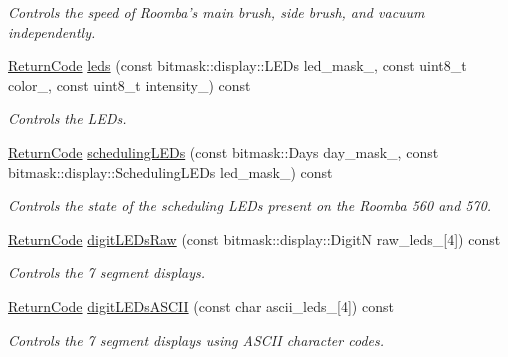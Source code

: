 \begin{DoxyCompactItemize}
\begin{DoxyCompactList}\small\item\em Controls the speed of Roomba’s main brush, side brush, and vacuum independently. \end{DoxyCompactList}\item 
\hyperlink{classroomba_1_1series500_1_1oi_1_1_o_i_encoder_ac2c8ad2f0306050926f89882d74696cc}{Return\+Code} \hyperlink{classroomba_1_1series500_1_1oi_1_1_o_i_encoder_a4f382fc939dad7b6a9618e36a5cf4d47}{leds} (const bitmask\+::display\+::\+L\+E\+Ds led\+\_\+mask\+\_\+, const uint8\+\_\+t color\+\_\+, const uint8\+\_\+t intensity\+\_\+) const 
\begin{DoxyCompactList}\small\item\em Controls the L\+E\+Ds. \end{DoxyCompactList}\item 
\hyperlink{classroomba_1_1series500_1_1oi_1_1_o_i_encoder_ac2c8ad2f0306050926f89882d74696cc}{Return\+Code} \hyperlink{classroomba_1_1series500_1_1oi_1_1_o_i_encoder_a42fe70c13a369206c439002c5859a27d}{scheduling\+L\+E\+Ds} (const bitmask\+::\+Days day\+\_\+mask\+\_\+, const bitmask\+::display\+::\+Scheduling\+L\+E\+Ds led\+\_\+mask\+\_\+) const 
\begin{DoxyCompactList}\small\item\em Controls the state of the scheduling L\+E\+Ds present on the Roomba 560 and 570. \end{DoxyCompactList}\item 
\hyperlink{classroomba_1_1series500_1_1oi_1_1_o_i_encoder_ac2c8ad2f0306050926f89882d74696cc}{Return\+Code} \hyperlink{classroomba_1_1series500_1_1oi_1_1_o_i_encoder_aafaa740b0a3d1214e351623fa736ed82}{digit\+L\+E\+Ds\+Raw} (const bitmask\+::display\+::\+Digit\+N raw\+\_\+leds\+\_\+\mbox{[}4\mbox{]}) const 
\begin{DoxyCompactList}\small\item\em Controls the 7 segment displays. \end{DoxyCompactList}\item 
\hyperlink{classroomba_1_1series500_1_1oi_1_1_o_i_encoder_ac2c8ad2f0306050926f89882d74696cc}{Return\+Code} \hyperlink{classroomba_1_1series500_1_1oi_1_1_o_i_encoder_ae660ba123459c7fcdef6b8db247e56cf}{digit\+L\+E\+Ds\+A\+S\+C\+I\+I} (const char ascii\+\_\+leds\+\_\+\mbox{[}4\mbox{]}) const 
\begin{DoxyCompactList}\small\item\em Controls the 7 segment displays using A\+S\+C\+I\+I character codes. \end{DoxyCompactList}\item 

\end{DoxyCompactItemize}
